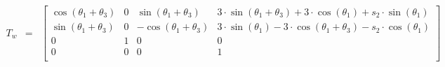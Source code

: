\begin{eqnarray}T_w&=&\begin{bmatrix}
\cos(\theta_1 + \theta_3)&0&\sin(\theta_1 + \theta_3)&3\cdot \sin(\theta_1 + \theta_3) + 3\cdot \cos(\theta_1) + s_2\cdot \sin(\theta_1)\\ 
\sin(\theta_1 + \theta_3)&0&-\cos(\theta_1 + \theta_3)&3\cdot \sin(\theta_1) - 3\cdot \cos(\theta_1 + \theta_3) - s_2\cdot \cos(\theta_1)\\ 
0&1&0&0\\ 
0&0&0&1\\ 
\end{bmatrix}\end{eqnarray}